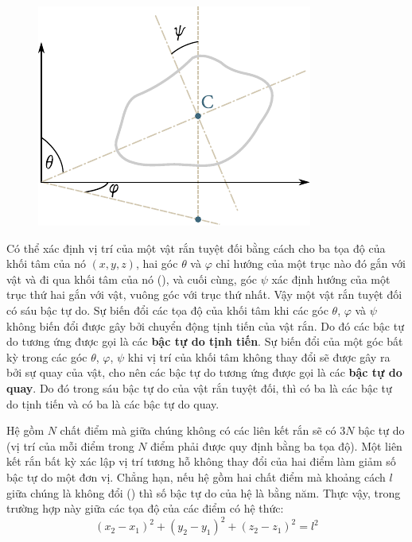 \begin{figure}[!htb]
	\begin{center}
		\includegraphics[scale=1.0]{figures/ch_11/fig_11_8.pdf}
		\caption[]{}
		\label{fig:11_8}
	\end{center}
	\vspace{-0.8cm}
\end{figure}

Có thể xác định vị trí của một vật rắn tuyệt đối bằng cách cho ba tọa độ của khối tâm của nó $(x, y, z)$, hai góc $\theta$ và $\varphi$ chỉ hướng của một trục nào đó gắn với vật và đi qua khối tâm của nó (), và cuối cùng, góc $\psi$ xác định hướng của một trục thứ hai gắn với vật, vuông góc với trục thứ nhất. Vậy một vật rắn tuyệt đối có sáu bậc tự do. Sự biến đổi các tọa độ của khối tâm khi các góc $\theta$, $\varphi$ và $\psi$ không biến đổi được gây bởi chuyển động tịnh tiến của vật rắn. Do đó các bậc tự do tương ứng được gọi là các \textbf{bậc tự do tịnh tiến}. Sự biến đổi của một góc bất kỳ trong các góc $\theta$, $\varphi$, $\psi$ khi vị trí của khối tâm không thay đổi sẽ được gây ra bởi sự quay của vật, cho nên các bậc tự do tương ứng được gọi là các \textbf{bậc tự do quay}. Do đó trong sáu bậc tự do của vật rắn tuyệt đối, thì có  ba là các bậc tự do tịnh tiến và có ba là các bậc tự do quay.

Hệ gồm $N$ chất điểm mà giữa chúng không có các liên kết rắn sẽ có $3N$ bậc tự do (vị trí của mỗi điểm trong $N$ điểm phải được quy định bằng ba tọa độ). Một liên kết rắn bất kỳ xác lập vị trí tương hỗ không thay đổi của hai điểm làm giảm số bậc tự do một đơn vị. Chẳng hạn, nếu hệ gồm hai chất điểm mà khoảng cách $l$ giữa chúng là không đổi () thì số bậc tự do của hệ là bằng năm. Thực vậy, trong trường hợp này giữa các tọa độ của các điểm có hệ thức:
\begin{equation}\label{eq:11_33}
	(x_2 - x_1)^2 + (y_2 - y_1)^2 + (z_2 - z_1)^2 = l^2
\end{equation}

